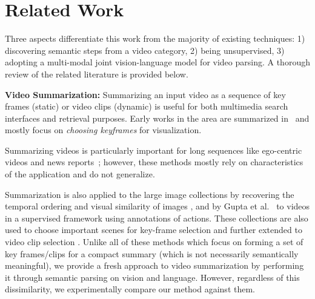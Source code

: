 
\section{Related Work}

Three aspects differentiate this work from the majority of existing techniques: 1) discovering semantic steps from a video category, 2) being unsupervised, 3) adopting a multi-modal joint vision-language model for video parsing. A thorough review of the related literature is provided below.

\noindent\textbf{Video Summarization:} Summarizing an input video as a sequence of key frames (static) or video clips (dynamic) is useful for both multimedia search interfaces and retrieval purposes. Early works in the area are summarized in~\cite{vidAbstraction} and mostly focus on \emph{choosing keyframes} for visualization.

Summarizing videos is particularly important for long sequences like ego-centric videos and news reports~\cite{lee2012discovering, lu2013story,rui2000automatically}; however, these methods mostly rely on characteristics of the application and do not generalize.

Summarization is also applied to the large image collections by recovering the temporal ordering and visual similarity of images \cite{storyGraph}, and by Gupta et al.~\cite{gupta2009understanding} to videos in a supervised framework using annotations of actions. These collections are also used to choose important scenes for key-frame selection \cite{khosla2013large} and further extended to video clip selection \cite{kim2014joint,potapov2014category}. Unlike all of these methods which  focus on forming a set of key frames/clips for a compact summary (which is not necessarily semantically meaningful), we provide a fresh approach to video summarization by performing it through semantic parsing on vision and language. However, regardless of this dissimilarity, we experimentally compare our method against them.

